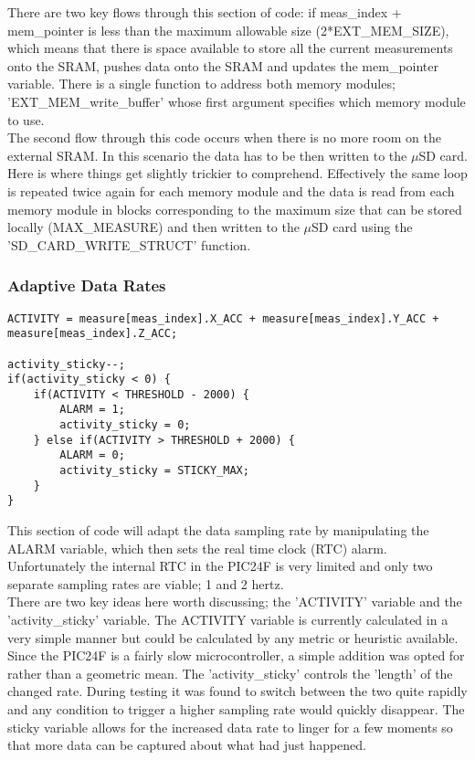 \documentclass[12pt,openany,a4paper]{book}
\begin{document}
				There are two key flows through this section of code: if meas\_index + mem\_pointer is less than the maximum allowable size (2*EXT\_MEM\_SIZE), which means that there is space available to store all the current measurements onto the SRAM, pushes data onto the SRAM and updates the mem\_pointer variable. There is a single function to address both memory modules; 'EXT\_MEM\_write\_buffer' whose first argument specifies which memory module to use. \\
				
				The second flow through this code occurs when there is no more room on the external SRAM. In this scenario the data has to be then written to the $\mu$SD card. Here is where things get slightly trickier to comprehend. Effectively the same loop is repeated twice again for each memory module and the data is read from each memory module in blocks corresponding to the maximum size that can be stored locally (MAX\_MEASURE) and then written to the $\mu$SD card using the 'SD\_CARD\_WRITE\_STRUCT' function. 
			\subsubsection{Adaptive Data Rates}
				\begin{lstlisting}
ACTIVITY = measure[meas_index].X_ACC + measure[meas_index].Y_ACC + measure[meas_index].Z_ACC;

activity_sticky--;
if(activity_sticky < 0) {
    if(ACTIVITY < THRESHOLD - 2000) {
        ALARM = 1;
        activity_sticky = 0;
    } else if(ACTIVITY > THRESHOLD + 2000) {
        ALARM = 0;
        activity_sticky = STICKY_MAX;
    }
}
        		\end{lstlisting}
        	This section of code will adapt the data sampling rate by manipulating the ALARM variable, which then sets the real time clock (RTC) alarm. Unfortunately the internal RTC in the PIC24F is very limited and only two separate sampling rates are viable; 1 and 2 hertz. \\
        	
        	There are two key ideas here worth discussing; the 'ACTIVITY' variable and the 'activity\_sticky' variable. The ACTIVITY variable is currently calculated in a very simple manner but could be calculated by any metric or heuristic available. Since the PIC24F is a fairly slow microcontroller, a simple addition was opted for rather than a geometric mean. The 'activity\_sticky' controls the 'length' of the changed rate. During testing it was found to switch between the two quite rapidly and any condition to trigger a higher sampling rate would quickly disappear. The sticky variable allows for the increased data rate to linger for a few moments so that more data can be captured about what had just happened.\\
        	
\end{document}
